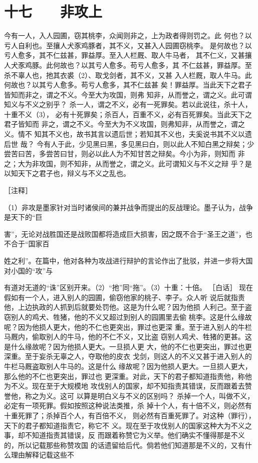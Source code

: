 \documentclass[12pt,UTF8]{ctexbook}
\begin{document}
\chapter{十七　　非攻上}

今有一人，入人园圃，窃其桃李，众闻则非之，上为政者得则罚之。此 
何也？以亏人自利也。至攘人犬豕鸡豚者，其不义，又甚入人园圃窃桃李。 
是何故也？以亏人愈多，其不仁兹甚，罪益厚。至入人栏厩、取人牛马者， 
其不仁义，又甚攘人犬豕鸡豚。此何故也？以其亏人愈多。苟亏人愈多，其 
不仁兹甚，罪益厚。至杀不辜人也，扡其衣裘（2）、取戈剑者，其不义，又甚 
入人栏厩，取人牛马。此何故也？以其亏人愈多。苟亏人愈多，其不仁兹甚 
矣！罪益厚。当此天下之君子皆知而非之，谓之不义。今至大为攻国，则弗 
知非，从而誉之，谓之义。此可谓知义与不义之别乎？ 
杀一人，谓之不义，必有一死罪矣。若以此说往，杀十人，十重不义（3）， 
必有十死罪矣；杀百人，百重不义，必有百死罪矣。当此天下之君子皆知而 
非之，谓之不义。今至大为不义攻国，则弗知非，从而誉之，谓之义。情不 
知其不义也，故书其言以遗后世；若知其不义也，夫奚说书其不义以遗后世 
哉？ 
今有人于此，少见黑曰黑，多见黑曰白，则以此人不知白黑之辩矣；少 
尝苦曰苦，多尝苦曰甘，则必以此人为不知甘苦之辩矣。今小为非，则知而 
非之；大为非攻国，则不知非，从而誉之，谓之义。此可谓知义与不义之辩 
乎？是以知天下之君子也，辩义与不义之乱也。 


［注释］ 

（1）非攻是墨家针对当时诸侯间的兼并战争而提出的反战理论。墨子认为，战争是天下的“巨 

害”，无论对战胜国还是战败国都将造成巨大损害，因之既不合于“圣王之道”，也不合于“国家百 

姓之利”。在篇中，他对各种为攻战进行辩护的言论作出了批驳，并进一步将大国对小国的“攻”与 

有道对无道的“诛”区别开来。（2）“扡”同“拖”。（3）十重：十倍。 
［白话］ 
现在假如有一个人，进入别人的园圃，偷窃他家的桃子、李子。众人听 
说后就指责他，上边执政的人抓到后就要处罚他。这是为什么呢？因为他损 
人利己。至于盗窃别人的鸡犬、牲猪，他的不义又超过到别人的园圃里去偷 
桃李。这是什么缘故呢？因为他损人更大，他的不仁也更突出，罪过也更深 
重。至于进入别人的牛栏马厩内，偷取别人的牛马，他的不仁不义，又比盗 
窃别人鸡犬、牲猪的更甚。这是什么缘故呢？因为他损人更大。一旦损人更 
大，他的不仁也更突出，罪过也更深重。至于妄杀无辜之人，夺取他的皮衣 
戈剑，则这人的不义又甚于进入别人的牛栏马厩盗取别人牛马的。这是什么 
缘故呢？因为他损人更大。一旦损人更大，那么他的不仁也更突出，罪过也 
更深重。对此，天下的君子都知道指责他，称他为不义。现在至于大规模地 
攻伐别人的国家，却不知指责其错误，反而跟着去赞誉他，称之为义。这可 
以算是明白义与不义的区别吗？ 
杀掉一个人，叫做不义，必定有一项死罪。假如按照这种说法类推，杀 
掉十个人，有十倍不义，则必然有十重死罪了；杀掉百个人，有百倍不义， 
则必然有百重死罪了。对这种（罪行），天下的君子都知道指责它，称它不 
义。现在至于攻伐别人的国家这种大为不义之事，却不知道指责其错误，反 
而跟着称赞它为义举。他们确实不懂得那是不义的，所以记载那些称赞攻国 
的话遗留给后代。倘若他们知道那是不义的，又有什么理由解释记载这些不 
\end{document}
